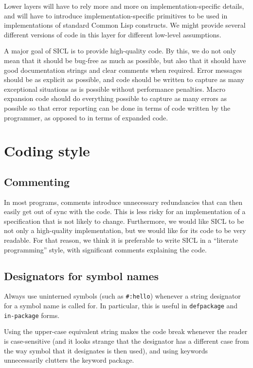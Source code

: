 \documentclass{article}
\def\sysname{SICL}
\begin{document}
Lower layers will have to rely more and more on
implementation-specific details, and will have to introduce
implementation-specific primitives to be used in implementations of
standard Common Lisp constructs.  We might provide several different
versions of code in this layer for different low-level assumptions.

A major goal of \sysname{} is to provide high-quality code.  By this,
we do not only mean that it should be bug-free as much as possible,
but also that it should have good documentation strings and clear
comments when required.  Error messages should be as explicit as
possible, and code should be written to capture as many exceptional
situations as is possible without performance penalties.  Macro
expansion code should do everything possible to capture as many errors
as possible so that error reporting can be done in terms of code
written by the programmer, as opposed to in terms of expanded code. 

\section{Coding style}

\subsection{Commenting}

In most programs, comments introduce unnecessary redundancies that can
then easily get out of sync with the code.  This is less risky for an
implementation of a specification that is not likely to change.
Furthermore, we would like \sysname{} to be not only a high-quality
implementation, but we would like for its code to be very readable.
For that reason, we think it is preferable to write \sysname{} in a
``literate programming'' style, with significant comments explaining
the code. 

\subsection{Designators for symbol names}

Always use uninterned symbols (such as \texttt{\#:hello}) whenever a
string designator for a symbol name is called for.  In particular,
this is useful in \texttt{defpackage} and \texttt{in-package} forms.

Using the upper-case equivalent string makes the code break whenever
the reader is case-sensitive (and it looks strange that the designator
has a different case from the way symbol that it designates is then
used), and using keywords unnecessarily clutters the keyword package.
\end{document}
